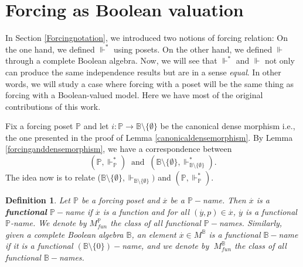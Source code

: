 \documentclass[10pt,longbibliography]{article}
\newtheorem{Theo}{Theorem}[section]
\newtheorem{Def}[Theo]{Definition}
\newcommand{\Po}{\mathbb{P}}
\newcommand{\B}{\mathbb{B}}
\newcommand{\ydot}{\overset{.}{y}}
\newcommand{\xdot}{\overset{.}{x}}
\newcommand{\forces}{\Vdash^{*}}
\newcommand{\Forces}{\Vdash}
\begin{document}
\section{Forcing as Boolean valuation}\label{forcingbooleanandposets}
 In Section \ref{Forcingnotation}, we introduced two notions of forcing relation: On the one hand, we defined $\forces$ using posets. On the other hand, we defined $\Forces$ through a complete Boolean algebra. Now, we will see that $\forces$ and $\Forces$ not only can produce the same independence results but are in a sense \emph{equal}. In other words, we will study a case where forcing with a poset will be the same thing as forcing with a Boolean-valued model. Here we have most of the original contributions of this work.




	
	


Fix a forcing poset $\Po$ and let $i: \Po \to \B \setminus \{\emptyset\}$ be the canonical dense morphism i.e., the one presented in the proof of  Lemma \ref{canonicaldensemorphism}.  By Lemma \ref{forcinganddensemorphism}, we have a correspondence between 
$$(\Po, \forces_{\Po})~\text{ and }~(\B\setminus \{\emptyset \},\forces_{\B \setminus \{\emptyset\}}).$$
The idea now is to relate ($\B\setminus \{\emptyset \},\Forces_{\B \setminus \{\emptyset\}})$ and $(\Po, \forces_{\Po})$.

\begin{Def}\label{functionalnamesdef}
	Let $\Po$ be a forcing poset and $\xdot$ be a $\Po-$name. Then $\xdot$ is a \textbf{functional} $\Po-$name if $\xdot$ is a function and for all $(\ydot, p) \in \xdot$, $\ydot$ is a functional $\Po$-name. We denote by $M^{\Po}_{fun}$ the class of all functional $\Po-$names. Similarly, given a complete Boolean algebra $\B$, an element $\xdot \in M^\B$ is a functional $\B-$name if it is a functional $(\B \setminus \{0\})-$name, and we denote by $~M^\B_{fun}$ the class of all functional $\B-$names.
\end{Def}
\end{document}
